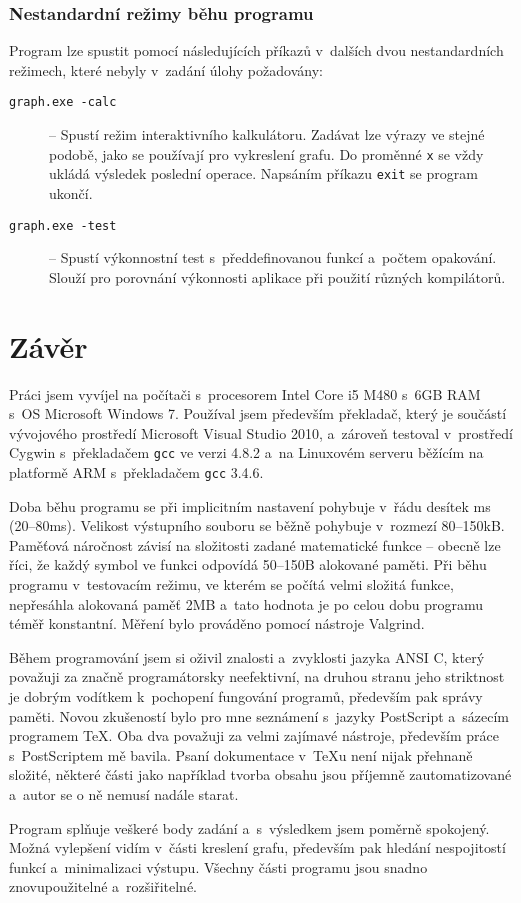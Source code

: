 \documentclass[pdftex,a4paper]{article}
\begin{document}
\subsubsection*{Nestandardní režimy běhu programu}\label{subsect:nestd-rezimy}
Program lze spustit pomocí následujících příkazů v~dalších dvou nestandardních režimech, které nebyly v~zadání úlohy požadovány:

\begin{description}
\item[\texttt{graph.exe -calc}] -- Spustí režim interaktivního kalkulátoru. Zadávat lze výrazy ve stejné podobě, jako se používají pro vykreslení grafu. Do proměnné \texttt{x} se vždy ukládá výsledek poslední operace. Napsáním příkazu \texttt{exit} se program ukončí.
\item[\texttt{graph.exe -test}] -- Spustí výkonnostní test s~předdefinovanou funkcí a~počtem opakování. Slouží pro porovnání výkonnosti aplikace při použití různých kompilátorů.
\end{description}







\newpage
\section{Závěr}

Práci jsem vyvíjel na počítači s~procesorem Intel Core i5 M480 s~6GB RAM s~OS Microsoft Windows 7. Používal jsem především překladač, který je součástí vývojového prostředí Microsoft Visual Studio 2010, a~zároveň testoval v~prostředí Cygwin s~překladačem \texttt{gcc} ve verzi 4.8.2 a~na Linuxovém serveru běžícím na platformě ARM s~překladačem \texttt{gcc} 3.4.6.

Doba běhu programu se při implicitním nastavení pohybuje v~řádu desítek ms (20--80ms). Velikost výstupního souboru se běžně pohybuje v~rozmezí 80--150kB. Paměťová náročnost závisí na složitosti zadané matematické funkce -- obecně lze říci, že každý symbol ve funkci odpovídá 50--150B alokované paměti. Při běhu programu v~testovacím režimu, ve kterém se počítá velmi složitá funkce, nepřesáhla alokovaná paměť 2MB a~tato hodnota je po celou dobu programu téměř konstantní. Měření bylo prováděno pomocí nástroje Valgrind.

Během programování jsem si oživil znalosti a~zvyklosti jazyka ANSI C, který považuji za značně programátorsky neefektivní, na druhou stranu jeho striktnost je dobrým vodítkem k~pochopení fungování programů, především pak správy paměti. Novou zkušeností bylo pro mne seznámení s~jazyky \textsf{PostScript} a~sázecím programem \TeX. Oba dva považuji za velmi zajímavé nástroje, především práce s~PostScriptem mě bavila. Psaní dokumentace v~\TeX u není nijak přehnaně složité, některé části jako například tvorba obsahu jsou příjemně zautomatizované a~autor se o ně nemusí nadále starat. 

Program splňuje veškeré body zadání a~s~výsledkem jsem poměrně spokojený. Možná vylepšení vidím v~části kreslení grafu, především pak hledání nespojitostí funkcí a~minimalizaci výstupu. Všechny části programu jsou snadno znovupoužitelné a~rozšiřitelné.
\end{document}
